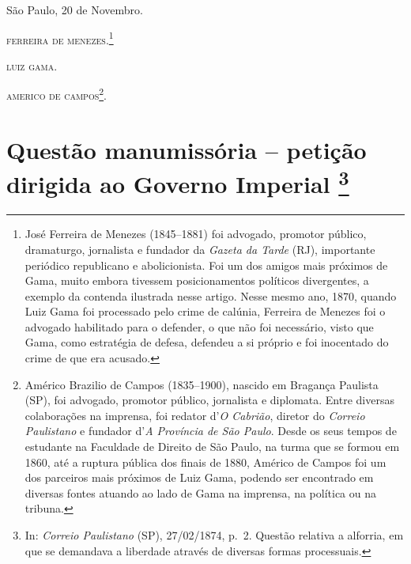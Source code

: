 São Paulo, 20 de Novembro.

\textsc{ferreira de menezes}.\footnote{ José Ferreira de Menezes (1845--1881) foi
  advogado, promotor público, dramaturgo, jornalista e fundador da
  \emph{Gazeta da Tarde} (RJ), importante periódico republicano e
  abolicionista. Foi um dos amigos mais próximos de Gama, muito embora
  tivessem posicionamentos políticos divergentes, a exemplo da contenda
  ilustrada nesse artigo. Nesse mesmo ano, 1870, quando Luiz Gama foi
  processado pelo crime de calúnia, Ferreira de Menezes foi o advogado
  habilitado para o defender, o que não foi necessário, visto que Gama,
  como estratégia de defesa, defendeu a si próprio e foi inocentado do
  crime de que era acusado.}

\textsc{luiz gama}.

\textsc{americo de campos}\footnote{ Américo Brazilio de Campos (1835--1900),
  nascido em Bragança Paulista (SP), foi advogado, promotor público,
  jornalista e diplomata. Entre diversas colaborações na imprensa, foi
  redator d'\emph{O Cabrião}, diretor do \emph{Correio Paulistano} e
  fundador d'\emph{A Província de São Paulo}. Desde os seus tempos de
  estudante na Faculdade de Direito de São Paulo, na turma que se formou
  em 1860, até a ruptura pública dos finais de 1880, Américo de Campos
  foi um dos parceiros mais próximos de Luiz Gama, podendo ser
  encontrado em diversas fontes atuando ao lado de Gama na imprensa, na
  política ou na tribuna.}.

\chapter{Questão manumissória -- petição dirigida ao Governo
Imperial
\footnote{ In: \emph{Correio Paulistano} (SP), 27/02/1874, p.~2.
  Questão relativa a alforria, em que se demandava a liberdade através
  de diversas formas processuais.}} %

